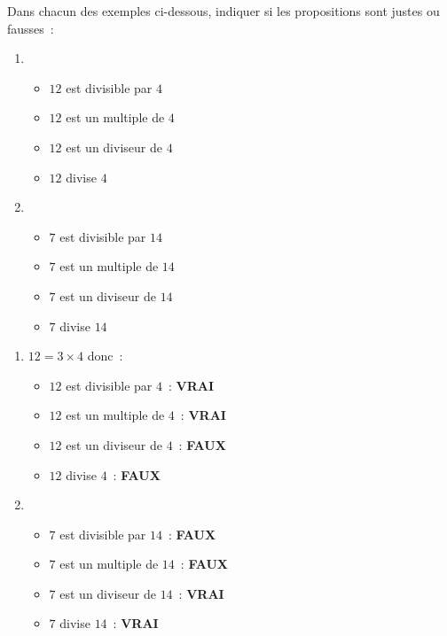 
Dans chacun des exemples ci-dessous, indiquer si les propositions sont justes ou fausses~:
\begin{enumerate}
     \item
     \begin{itemize}
          \item
          $12$ est divisible par $4$
          \item
          $12$ est un multiple de $4$
          \item
          $12$ est un diviseur de $4$
          \item
          $12$ divise $4$
     \end{itemize}
     \item
     \begin{itemize}
          \item
          $7$ est divisible par $14$
          \item
          $7$ est un multiple de $14$
          \item
          $7$ est un diviseur de $14$
          \item
          $7$ divise $14$
     \end{itemize}
\end{enumerate}
\begin{corrige}
     \begin{enumerate}
          \item
          $12=3\times 4$ donc~:
          \begin{itemize}
               \item
               $12$ est divisible par $4$~: \textbf{VRAI}
               \item
               $12$ est un multiple de $4$~: \textbf{VRAI}
               \item
               $12$ est un diviseur de $4$~: \textbf{FAUX}
               \item
               $12$ divise $4$~: \textbf{FAUX}
          \end{itemize}
          \item
          \begin{itemize}
               \item
               $7$ est divisible par $14$~: \textbf{FAUX}
               \item
               $7$ est un multiple de $14$~: \textbf{FAUX}
               \item
               $7$ est un diviseur de $14$~: \textbf{VRAI}
               \item
               $7$ divise $14$~: \textbf{VRAI}
          \end{itemize}
     \end{enumerate}
\end{corrige}
